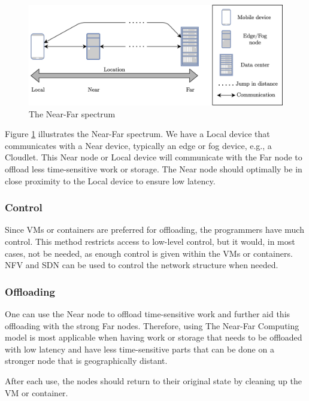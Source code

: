 \begin{figure}[t]
    \centering
    \includegraphics[scale=1]{chapters/6_evaluation/figures/near-far_diagram.png}
    \caption{The Near-Far spectrum}
    \label{fig:nearFarSimple}
\end{figure}


Figure \ref{fig:nearFarSimple} illustrates the Near-Far spectrum. We have a Local device that communicates with a Near device, typically an edge or fog device, e.g., a Cloudlet. This Near node or Local device will communicate with the Far node to offload less time-sensitive work or storage. The Near node should optimally be in close proximity to the Local device to ensure low latency.

\subsubsection{Control}
Since VMs or containers are preferred for offloading, the programmers have much control. This method restricts access to low-level control, but it would, in most cases, not be needed, as enough control is given within the VMs or containers. NFV and SDN can be used to control the network structure when needed.

\subsubsection{Offloading}
One can use the Near node to offload time-sensitive work and further aid this offloading with the strong Far nodes. Therefore, using The Near-Far Computing model is most applicable when having work or storage that needs to be offloaded with low latency and have less time-sensitive parts that can be done on a stronger node that is geographically distant. 

After each use, the nodes should return to their original state by cleaning up the VM or container.


